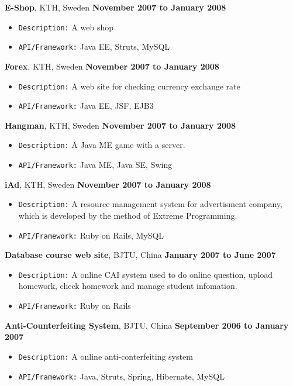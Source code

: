\documentclass[10pt]{article}
\newenvironment{outerlist}[1][\enskip\textbullet]%
        {\begin{itemize}[#1]}{\end{itemize}%
         \vspace{-.6\baselineskip}}
\newcommand{\blankline}{\quad\pagebreak[2]}
\begin{document}
\blankline

\textbf{E-Shop}, KTH, Sweden \hfill \textbf{November 2007 to January 2008}
\begin{outerlist}
\item \texttt{Description:}
A web shop
\item \texttt{API/Framework:}
Java EE, Struts, MySQL
\end{outerlist}

\blankline

\textbf{Forex}, KTH, Sweden \hfill \textbf{November 2007 to January 2008}
\begin{outerlist}
\item \texttt{Description:}
A web site for checking currency exchange rate
\item \texttt{API/Framework:}
Java EE, JSF, EJB3
\end{outerlist}

\blankline

\textbf{Hangman}, KTH, Sweden \hfill \textbf{November 2007 to January 2008}
\begin{outerlist}
\item \texttt{Description:}
A Java ME game with a server.
\item \texttt{API/Framework:}
Java ME, Java SE, Swing
\end{outerlist}

\blankline

\textbf{iAd}, KTH, Sweden \hfill \textbf{November 2007 to January 2008}
\begin{outerlist}
\item \texttt{Description:}
A resource management system for advertisment company, which is developed by the method of Extreme Programming.
\item \texttt{API/Framework:}
Ruby on Rails, MySQL
\end{outerlist}

\blankline

\textbf{Database course web site}, BJTU, China \hfill \textbf{January 2007 to June 2007}
\begin{outerlist}
\item \texttt{Description:}
A online CAI system used to do online question, upload homework, check homework and manage student infomation.
\item \texttt{API/Framework:}
Ruby on Rails
\end{outerlist}

\blankline

\textbf{Anti-Counterfeiting System}, BJTU, China \hfill \textbf{September 2006 to January 2007}
\begin{outerlist}
\item \texttt{Description:}
A online anti-conterfeiting system
\item \texttt{API/Framework:}
Java, Struts, Spring, Hibernate, MySQL
\end{outerlist}
\end{document}

